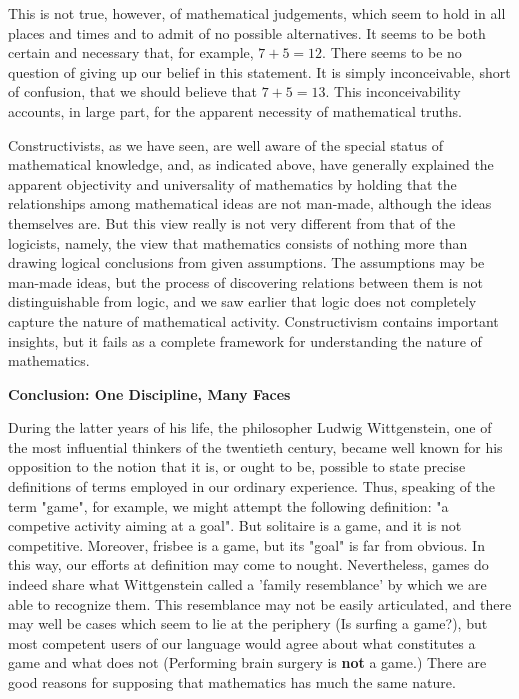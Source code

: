 This is not true, however, of mathematical judgements, which seem to hold in all places and times and to admit of no possible alternatives.  It seems to be both certain and necessary that, for example, $7 + 5 = 12$.  There seems to be no question of giving up
our belief in this statement.  It is simply inconceivable, short of confusion, that we should believe that $7 + 5 = 13$.  This inconceivability accounts, in large part, for
the apparent necessity of mathematical truths.
  
Constructivists, as we have seen, are well aware of the special status of mathematical knowledge, and, as indicated above, have generally explained the apparent objectivity and universality of mathematics by holding that the relationships among mathematical ideas are not man-made, although the ideas themselves are.  But this view really is not very different from that of the logicists, namely, the view that mathematics consists of nothing more than drawing logical conclusions from given assumptions.  The assumptions may be man-made ideas, but the process of discovering relations between them is not distinguishable from logic, and we saw earlier that logic does not completely capture the nature of mathematical activity.  Constructivism contains important insights, but it fails as a complete framework for understanding the nature of mathematics. 

\noindent
\textbf{Conclusion: One Discipline, Many Faces}

 During the latter years of his life, the philosopher Ludwig Wittgenstein, one of the most influential thinkers of the twentieth century, became well known for his opposition to the notion that it is, or ought to be, possible to state precise definitions of terms employed in our ordinary experience.  Thus, speaking of the term "game", for example, we might attempt the following definition: "a competive activity aiming at a goal".  But solitaire is a game, and it is not competitive.  Moreover, frisbee is a game, but its "goal" is far from obvious.  In this way, our efforts at definition may come to nought.  Nevertheless, games do indeed share what Wittgenstein called a 'family resemblance' by which we are able to recognize them.  This resemblance may not be easily articulated, and there may well be cases which seem to lie at the periphery (Is surfing a game?), but most competent users of our language would agree about what constitutes a game and what does not (Performing brain surgery is \textbf{not} a game.)  There are good reasons for supposing that mathematics has much the same nature.
 

